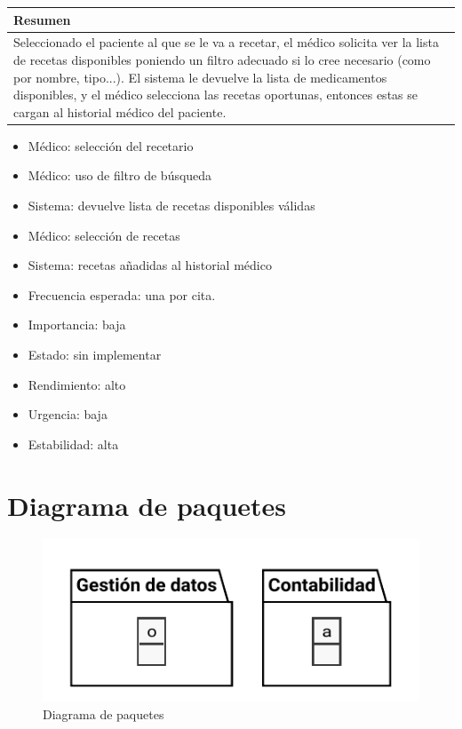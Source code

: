 \documentclass[11pt,a4paper]{article}
\begin{document}
\begin{table}[h]
	\centering
	\begin{tabular}{l}
		\hline
		\multicolumn{1}{|l|}{Resumen} \\ \hline
		Seleccionado el paciente al que se le va a recetar, el médico solicita ver la lista de recetas disponibles poniendo un filtro adecuado si lo cree necesario (como por nombre, tipo...). El sistema le devuelve la lista de medicamentos disponibles, y el médico selecciona las recetas oportunas, entonces estas se cargan al historial médico del paciente.
	\end{tabular}
\end{table}

\begin{itemize}
	\item Médico: selección del recetario
	\item Médico: uso de filtro de búsqueda
	\item Sistema: devuelve lista de recetas disponibles válidas
	\item Médico: selección de recetas
	\item Sistema: recetas añadidas al historial médico
\end{itemize}


\begin{itemize}
	\item Frecuencia esperada: una por cita.
	\item Importancia: baja
	\item Estado: sin implementar
	\item Rendimiento: alto
	\item Urgencia: baja
	\item Estabilidad: alta
\end{itemize}




\section{Diagrama de paquetes}

\begin{figure}[H]
	\caption{Diagrama de paquetes}
	\centering
	\includegraphics{diagramas/paquetes}
\end{figure}
	
	
\end{document}
